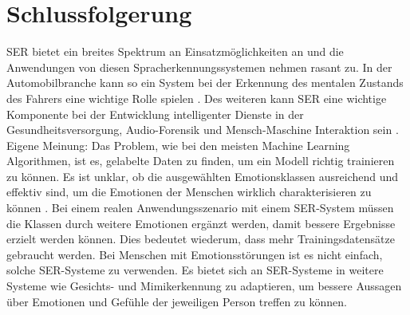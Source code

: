\chapter{Schlussfolgerung}

SER bietet ein breites Spektrum an Einsatzmöglichkeiten an und die Anwendungen von diesen Spracherkennungssystemen nehmen rasant zu. In der Automobilbranche kann so ein System bei der Erkennung des mentalen Zustands des Fahrers eine wichtige Rolle spielen \cite{badshah2019deep}. Des weiteren kann SER eine wichtige Komponente bei der Entwicklung intelligenter Dienste in der Gesundheitsversorgung, Audio-Forensik und Mensch-Maschine Interaktion sein \cite{badshah2019deep}.
\newline
Eigene Meinung:
 Das Problem, wie bei den meisten Machine Learning Algorithmen, ist es, gelabelte Daten zu finden, um ein Modell richtig trainieren zu können. Es ist unklar, ob die ausgewählten Emotionsklassen ausreichend und effektiv sind, um die Emotionen der Menschen wirklich charakterisieren zu können \cite{cnn}. Bei einem realen Anwendungsszenario mit einem SER-System müssen die Klassen durch weitere Emotionen ergänzt werden, damit bessere Ergebnisse erzielt werden können. Dies bedeutet wiederum, dass mehr Trainingsdatensätze gebraucht werden. Bei Menschen mit Emotionsstörungen ist es nicht einfach, solche SER-Systeme zu verwenden. Es bietet sich an SER-Systeme in weitere Systeme wie Gesichts- und Mimikerkennung zu adaptieren, um bessere Aussagen über Emotionen und Gefühle der jeweiligen Person treffen zu können.
